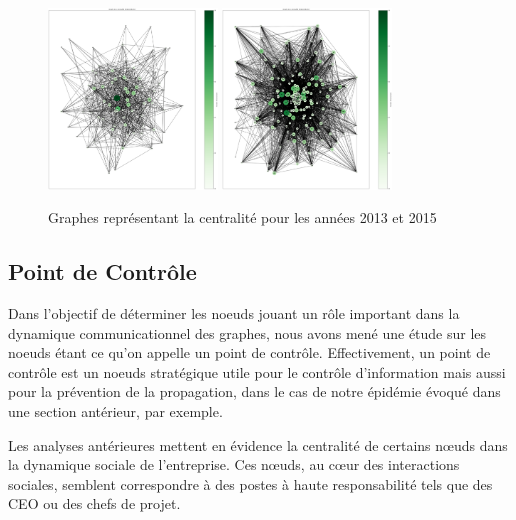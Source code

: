 \documentclass{article}
\begin{document}
\begin{figure}[!h]
    \centering
    \includegraphics[width=0.40\textwidth]{assets/centralite/between_centralite_2013.png}
    \hfill
    \includegraphics[width=0.40\textwidth]{assets/centralite/between_centralite_2015.png}
    \caption{Graphes représentant la centralité pour les années 2013 et 2015}
    \label{fig:deg_centralite_parallel}
\end{figure}

\subsection{Point de Contrôle}


Dans l’objectif de déterminer les noeuds jouant un rôle important dans la dynamique communicationnel des graphes, nous avons mené une étude sur les noeuds étant ce qu’on appelle un point de contrôle. Effectivement, un point de contrôle est un noeuds stratégique utile pour le contrôle d’information mais aussi pour la prévention de la propagation, dans le cas de notre épidémie évoqué dans une section antérieur, par exemple.

Les analyses antérieures mettent en évidence la centralité de certains nœuds dans la dynamique sociale de l'entreprise. Ces nœuds, au cœur des interactions sociales, semblent correspondre à des postes à haute responsabilité tels que des CEO ou des chefs de projet.
\end{document}
